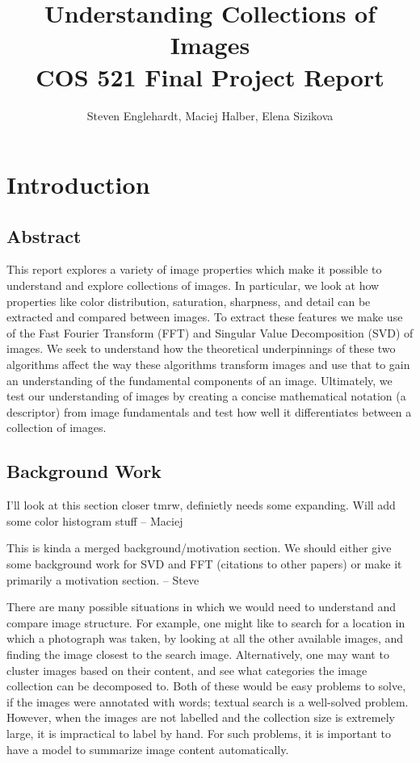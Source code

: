 \documentclass{report}
\author{Steven Englehardt, Maciej Halber, Elena Sizikova}
\title{Understanding Collections of Images \\ \small{COS 521 Final Project Report}}
\begin{document}
\maketitle
\tableofcontents

\chapter{Introduction}
\section{Abstract}
This report explores a variety of image properties which make it possible to understand and explore collections of images. In particular, we look at how properties like color distribution, saturation, sharpness, and detail can be extracted and compared between images. To extract these features we make use of the Fast Fourier Transform (FFT) and Singular Value Decomposition (SVD) of images. We seek to understand how the theoretical underpinnings of these two algorithms affect the way these algorithms transform images and use that to gain an understanding of the fundamental components of an image. Ultimately, we test our understanding of images by creating a concise mathematical notation (a descriptor) from image fundamentals and test how well it differentiates between a collection of images.

\section{Background Work}
{\color{red} I'll look at this section closer tmrw, definietly needs some expanding. Will add some color histogram stuff  -- Maciej}

{\color{red} This is kinda a merged background/motivation section. We should either give some background work for SVD and FFT (citations to other papers) or make it primarily a motivation section. -- Steve}

There are many possible situations in which we would need to understand and compare image structure. For example, one might like to search for a location in which a photograph was taken, by looking at all the other available images, and finding the image closest to the search image. Alternatively, one may want to cluster images based on their content, and see what categories the image collection can be decomposed to. Both of these would be easy problems to solve, if the images were annotated with words; textual search is a well-solved problem. However, when the images are not labelled and the collection size is extremely large, it is impractical to label by hand. For such problems, it is important to have a model to summarize image content automatically.
\end{document}
